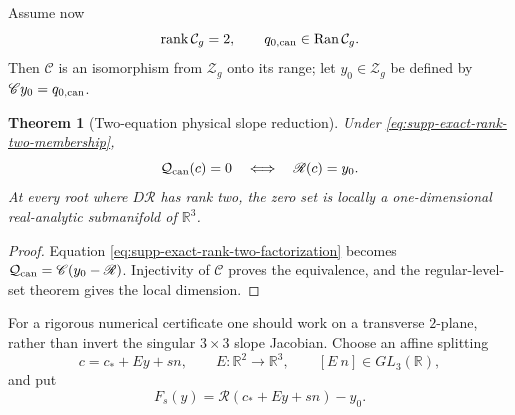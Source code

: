 \documentclass[11pt]{article}
\newtheorem{theorem}{Theorem}[section]
\numberwithin{equation}{section}
\theoremstyle{definition}
\theoremstyle{remark}
\newcommand{\rank}{\operatorname{rank}}
\newcommand{\Ran}{\operatorname{Ran}}
\begin{document}
Assume now
\begin{equation}
 \rank\mathcal C_g=2,
 \qquad
 q_{0,\rm can}\in\Ran\mathcal C_g.
 \label{eq:supp-exact-rank-two-membership}
\end{equation}
Then $\mathscr C$ is an isomorphism from $\mathcal Z_g$ onto its range; let
$y_0\in\mathcal Z_g$ be defined by $\mathscr C y_0=q_{0,\rm can}$.

\begin{theorem}[Two-equation physical slope reduction]
\label{thm:supp-exact-two-equation-slope}
Under \eqref{eq:supp-exact-rank-two-membership},
\begin{equation}
 \mathcal Q_{\rm can}(c)=0
 \quad\Longleftrightarrow\quad
 \mathscr R(c)=y_0.
 \label{eq:supp-exact-two-equation-slope}
\end{equation}
At every root where $D\mathscr R$ has rank two, the zero set is locally a
one-dimensional real-analytic submanifold of $\mathbb R^3$.
\end{theorem}
\begin{proof}
Equation \eqref{eq:supp-exact-rank-two-factorization} becomes
$\mathcal Q_{\rm can}=\mathscr C(y_0-\mathscr R)$.  Injectivity of
$\mathscr C$ proves the equivalence, and the regular-level-set theorem gives
the local dimension.
\end{proof}

For a rigorous numerical certificate one should work on a transverse
$2$-plane, rather than invert the singular $3\times3$ slope Jacobian.  Choose
an affine splitting
\begin{equation}
 c=c_*+Ey+sn,
 \qquad E:\mathbb R^2\to\mathbb R^3,
 \qquad [E\ n]\in GL_3(\mathbb R),
 \label{eq:supp-exact-slope-slice}
\end{equation}
and put
\begin{equation}
 F_s(y)=\mathscr R(c_*+Ey+sn)-y_0.
 \label{eq:supp-exact-slope-slice-map}
\end{equation}
\end{document}
